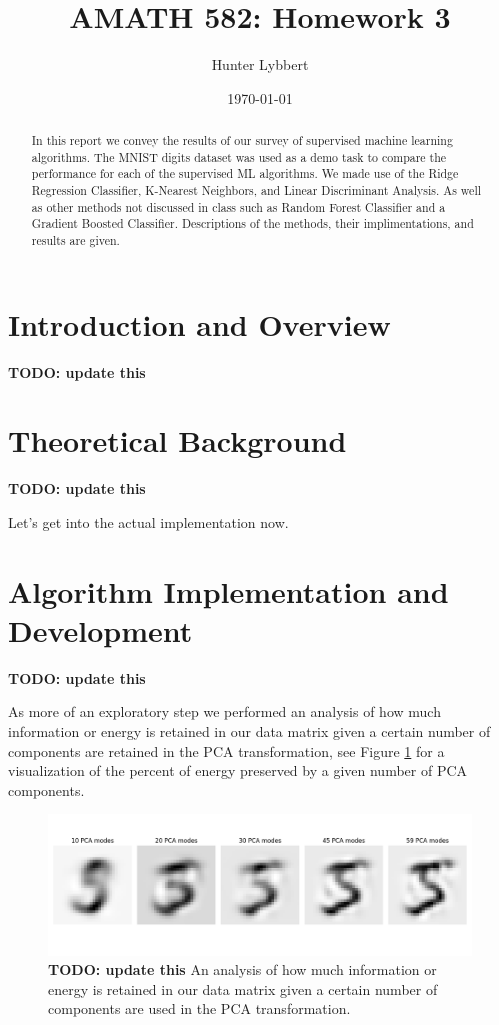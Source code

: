 \documentclass[11pt]{amsart}
\title{AMATH 582: Homework 3}
\author{Hunter Lybbert} %
\date{\today} %
\begin{document}
\maketitle

\begin{abstract}
    In this report we convey the results of our survey of supervised machine learning algorithms.
    The MNIST digits dataset was used as a demo task to compare the performance for each of the supervised ML algorithms. We made use of the Ridge Regression Classifier, K-Nearest Neighbors, and Linear Discriminant Analysis. As well as other methods not discussed in class such as Random Forest Classifier and a Gradient Boosted Classifier. Descriptions of the methods, their implimentations, and results are given.
\end{abstract}

\section{Introduction and Overview}\label{sec:Introduction} \textbf{TODO: update this}

\section{Theoretical Background}\label{sec:theory} \textbf{TODO: update this}

Let's get into the actual implementation now.

\section{Algorithm Implementation and Development}\label{sec:algorithms} \textbf{TODO: update this}

As more of an exploratory step we performed an analysis of how much information or energy is retained in our data matrix given a certain number of components are retained in the PCA transformation, see Figure \ref{fig:f0} for a visualization of the percent of energy preserved by a given number of PCA components.

\begin{figure}[h]
	\centering
	\includegraphics[width=.5\textwidth]{../visualizations/digit_reconstruction.png}
 	\caption{ \textbf{TODO: update this} An analysis of how much information or energy is retained in our data matrix given a certain number of components are used in the PCA transformation.}\label{fig:f0}
\end{figure}
\end{document}
